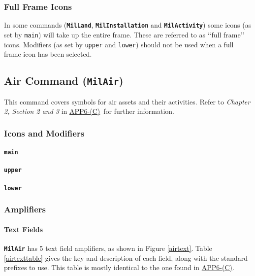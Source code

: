 \documentclass[a4paper, titlepage]{article}
\newcommand\DocLink{\href{https://www.awl.edu.pl/images/en/APP_6_C.pdf}{APP6-(C)}}
\begin{document}
\subsubsection{Full Frame Icons}

In some commands (\textbf{\texttt{MilLand}}, \textbf{\texttt{MilInstallation}} and \textbf{\texttt{MilActivity}}) some icons (as set by \texttt{main}) will take up the entire frame. These are referred to as \lq\lq{}full frame\rq\rq{} icons. Modifiers (as set by \texttt{upper} and \texttt{lower}) should not be used when a full frame icon has been selected.

\subsection{Air Command (\textbf{\texttt{MilAir}})}

This command covers symbols for air assets and their activities. Refer to \textit{Chapter 2, Section 2 and 3} in \DocLink\ for further information.

\subsubsection{Icons and Modifiers}

\paragraph{\texttt{main}}\quad


\paragraph{\texttt{upper}}\quad


\paragraph{\texttt{lower}}\quad 


\subsubsection{Amplifiers}

\paragraph{Text Fields}

\textbf{\texttt{MilAir}} has 5 text field amplifiers, as shown in Figure \ref{airtext}. Table \ref{airtexttable} gives the key and description of each field, along with the standard prefixes to use. This table is mostly identical to the one found in \DocLink.
\end{document}
